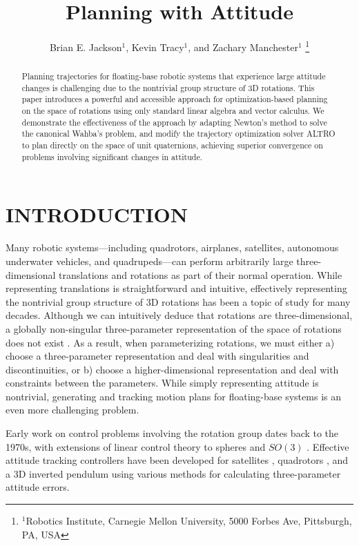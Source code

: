 \documentclass[letterpaper, 10 pt, conference]{ieeeconf}  %
\title{\LARGE \bf
Planning with Attitude
}
\author{Brian E. Jackson$^1$, Kevin Tracy$^1$, and Zachary Manchester$^1$%
    \thanks{
        $^1$Robotics Institute, 
        Carnegie Mellon University, 
        5000 Forbes Ave, Pittsburgh, PA, USA
    }
}
\begin{document}
\maketitle

\begin{abstract}
Planning trajectories for floating-base robotic systems that experience
large attitude changes is challenging due to the nontrivial group structure of 3D
rotations. This paper introduces a powerful and accessible approach for 
optimization-based planning on the space of rotations using only standard linear algebra and vector calculus. We demonstrate the effectiveness of the approach by adapting Newton's
method to solve the canonical Wahba's problem, and modify the trajectory optimization solver ALTRO to plan directly on the space of unit 
quaternions, achieving superior convergence on problems involving significant changes 
in attitude.

\end{abstract}

\section{INTRODUCTION}

    Many robotic systems---including quadrotors, airplanes, satellites, autonomous
    underwater vehicles, and quadrupeds---can perform arbitrarily large three-dimensional
    translations and rotations as part of their normal operation. While representing
    translations is straightforward and intuitive, effectively representing the
    nontrivial group structure of 3D rotations has been a topic of study for many
    decades. Although we can intuitively deduce that rotations are three-dimensional, a
    globally non-singular three-parameter representation of the space of rotations does
    not exist \cite{stuelpnagel1964parametrization}. As a result, when parameterizing
    rotations, we must either a) choose a three-parameter representation and deal with
    singularities and discontinuities, or b) choose a higher-dimensional representation and deal with
    constraints between the parameters. While simply representing attitude is nontrivial,
    generating and tracking motion plans for floating-base systems is an even more
    challenging problem.

    Early work on control problems involving the rotation group dates back to the 1970s,
    with extensions of linear control theory to spheres \cite{Brockett1973} and $SO(3)$
    \cite{Baillieul1978}. Effective attitude tracking controllers have been developed for
    satellites \cite{wie1985quaternion}, quadrotors
    \cite{Fresk2013,Liu2015,lee2010geometric,
    Johnson2005,watterson2020control,mellinger2011minimum}, and a 3D inverted pendulum
    \cite{Chaturvedi2009} using various methods for calculating three-parameter attitude
    errors.
\end{document}
